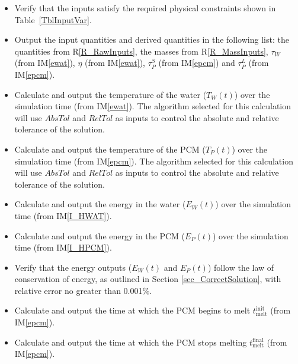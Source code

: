 \documentclass[12pt]{article}
\newcommand{\iref}[1]{IM\ref{#1}}
\newcounter{reqnum} %
\newcommand{\rref}[1]{R\ref{#1}}
\begin{document}
\begin{itemize}
\item[R\refstepcounter{reqnum}\thereqnum \label{R_CheckInputs}:] Verify that the
  inputs satisfy the required physical constraints shown in Table~\ref{TblInputVar}.

\item[R\refstepcounter{reqnum}\thereqnum \label{R_OutputInputs}:] Output the input
  quantities and derived quantities in the following list: the quantities from
  \rref{R_RawInputs}, the masses from \rref{R_MassInputs}, $\tau_W$ (from
  \iref{ewat}), $\eta$ (from \iref{ewat}), $\tau_P^S$ (from \iref{epcm}) and
  $\tau_P^L$ (from \iref{epcm}).

\item[R\refstepcounter{reqnum}\thereqnum \label{R_TempWater}:] Calculate and
  output the temperature of the water ($T_W(t)$) over the simulation time  (from
  \iref{ewat}).  The algorithm selected for this calculation will use
  $\mathit{AbsTol}$ and $\mathit{RelTol}$ as inputs to control the absolute and
  relative tolerance of the solution.

\item[R\refstepcounter{reqnum}\thereqnum \label{R_TempPCM}:] Calculate and
  output the temperature of the PCM ($T_P(t)$) over the simulation time (from
  \iref{epcm}).  The algorithm selected for this calculation will use
  $\mathit{AbsTol}$ and $\mathit{RelTol}$ as inputs to control the absolute and
  relative tolerance of the solution.

\item[R\refstepcounter{reqnum}\thereqnum \label{R_EnergyWater}:] Calculate and
  output the energy in the water ($E_W(t)$) over the simulation time (from
  \iref{I_HWAT}).

\item[R\refstepcounter{reqnum}\thereqnum \label{R_EnergyPCM}:] Calculate and
  output the energy in the PCM ($E_P(t)$) over the simulation time (from
  \iref{I_HPCM}).
  
\item[R\refstepcounter{reqnum}\thereqnum \label{R_VerifyOutput}:] Verify that the
  energy outputs ($E_W(t)$ and $E_P(t)$) follow the law of conservation of energy, 
  as outlined in Section \ref{sec_CorrectSolution}, with relative error no greater 
  than 0.001\%.

\item[R\refstepcounter{reqnum}\thereqnum \label{R_timeMeltBegin}:] Calculate and
  output the time at which the PCM begins to melt $t_\text{melt}^\text{init}$
  (from \iref{epcm}).

\item[R\refstepcounter{reqnum}\thereqnum \label{R_timeMeltEnd}:] Calculate and
  output the time at which the PCM stops melting $t_\text{melt}^\text{final}$
  (from \iref{epcm}).

\end{itemize}
\end{document}
